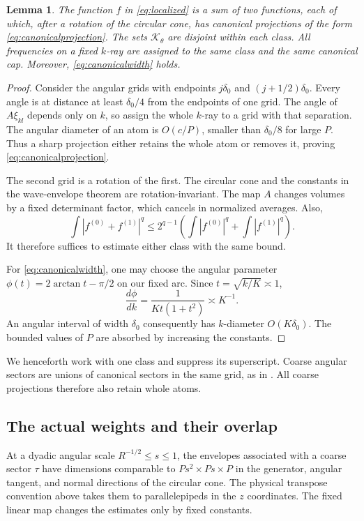 \documentclass[11pt,reqno]{amsart}
\numberwithin{equation}{section}
\newtheorem{lemma}[lemma]{Lemma}
\theoremstyle{definition}
\theoremstyle{remark}
\begin{document}
\begin{lemma}\label{lem:grids}
The function $f$ in \eqref{eq:localized} is a sum of two functions, each of which, after a rotation of the circular cone, has canonical projections of
the form \eqref{eq:canonicalprojection}.
The sets $\mathcal K_\theta$ are disjoint within each class.
All frequencies on a fixed $k$-ray are assigned to the same class and the same canonical cap.
Moreover,
\eqref{eq:canonicalwidth} holds.
\end{lemma}
\begin{proof}
Consider the angular grids with endpoints $j\delta_0$ and $(j+1/2)\delta_0$.
Every angle is at distance at least $\delta_0/4$ from the endpoints of one grid.
The angle of $A\xi_{kl}$ depends only on $k$, so assign the whole $k$-ray to a grid with that separation.
The angular diameter of an atom is $O(c/P)$, smaller than $\delta_0/8$ for large $P$.
Thus a sharp projection either retains the whole atom or removes it, proving \eqref{eq:canonicalprojection}.

The second grid is a rotation of the first. The circular cone and the constants in the wave-envelope theorem are rotation-invariant.
The map $A$ changes volumes by a fixed determinant factor, which cancels in normalized averages.
Also,
\[
 \int|f^{(0)}+f^{(1)}|^q\le2^{q-1}
 \left(\int|f^{(0)}|^q+\int|f^{(1)}|^q\right).
\]
It therefore suffices to estimate either class with the same bound.

For \eqref{eq:canonicalwidth}, one may choose the angular parameter
$\phi(t)=2\arctan t-\pi/2$ on our fixed arc. Since $t=\sqrt{k/K}\asymp1$,
\[
 \frac{d\phi}{dk}=\frac1{K t(1+t^2)}\asymp K^{-1}.
\]
An angular interval of width $\delta_0$ consequently has $k$-diameter $O(K\delta_0)$.
The bounded values of $P$ are absorbed by increasing the constants.
\end{proof}
We henceforth work with one class and suppress its superscript.
Coarse angular sectors are unions of canonical sectors in the same grid, as in \cite[Section~5]{GM}.
All coarse projections therefore also retain whole atoms.

\subsection{The actual weights and their overlap}
At a dyadic angular scale $R^{-1/2}\le s\le1$, the envelopes associated with a coarse sector $\tau$ have dimensions comparable to
$Ps^2\times Ps\times P$
in the generator, angular tangent, and normal directions of the circular cone.
The physical transpose convention above takes them to parallelepipeds in the $z$ coordinates. The fixed linear map changes the estimates only by fixed constants.
\end{document}
